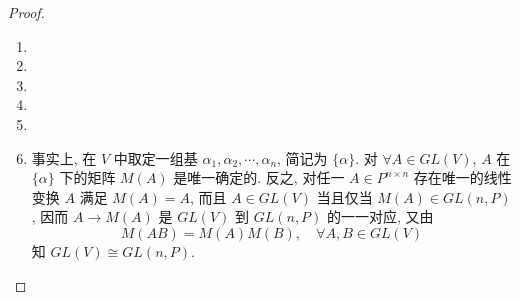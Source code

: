 \documentclass[../../main.tex]{subfiles}
\begin{document}
\begin{proof}
\begin{enumerate}
\item 

\item 

\item 

\item 

\item 

\item 事实上, 在 \( V \) 中取定一组基 \( \alpha_1,\alpha_2,\cdots,\alpha_n \), 简记为 \( \{\alpha\} \). 对 \( \forall A \in GL(V) \), \( A \) 在 \( \{\alpha\} \) 下的矩阵 \( M(A) \) 是唯一确定的. 反之, 对任一 \( A \in P^{n \times n} \) 存在唯一的线性变换 \( A \) 满足 \( M(A) = A \), 而且 \( A \in GL(V) \) 当且仅当 \( M(A) \in GL(n,P) \), 因而 \( A \to M(A) \) 是 \( GL(V) \) 到 \( GL(n,P) \) 的一一对应, 又由
\[
M(AB) = M(A)M(B), \quad \forall A,B \in GL(V)
\]
知 \( GL(V) \cong GL(n,P) \).
\end{enumerate}

\end{proof}
\end{document}
